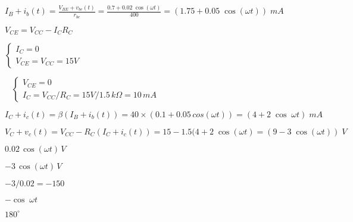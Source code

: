 \documentclass{article}
\def\lthtmlcheckvsize{\ifdim\ht\sizebox<\vsize 
  \ifdim\wd\sizebox<\hsize\expandafter\hfill\fi \expandafter\vfill
  \else\expandafter\vss\fi}%
\begin{document}
{\newpage\clearpage
{}%
$\displaystyle I_B+i_b(t) =\frac{V_{BE}+v_{be}(t)}{r_{be}}
=\frac{0.7+0.02\;\cos(\omega t)}{400}
=(1.75+0.05\;\cos(\omega t))\;mA$%
\lthtmlindisplaymathZ
\lthtmlcheckvsize\clearpage}

{\newpage\clearpage
{}%
$ V_{CE}=V_{CC}-I_C R_C$%
\lthtmlindisplaymathZ
\lthtmlcheckvsize\clearpage}

{\newpage\clearpage
{}%
$\displaystyle \left\{\begin{array}{l}
I_C=0\\V_{CE}=V_{CC}=15V\end{array}\right.
\;\;\;$%
\lthtmlindisplaymathZ
\lthtmlcheckvsize\clearpage}

{\newpage\clearpage
{}%
$\displaystyle \;\;\;
\left\{\begin{array}{l}
V_{CE}=0\\I_C=V_{CC}/R_C=15V/1.5\,k\Omega=10\, mA \end{array}\right.$%
\lthtmlindisplaymathZ
\lthtmlcheckvsize\clearpage}

{\newpage\clearpage
{}%
$\displaystyle I_C+i_c(t)=\beta (I_B+i_b(t))=40\times (0.1+0.05\, cos(\omega t))
=(4 + 2\;\cos\;\omega t) \; mA$%
\lthtmlindisplaymathZ
\lthtmlcheckvsize\clearpage}

{\newpage\clearpage
{}%
$\displaystyle V_C+v_c(t)=V_{CC}-R_C(I_C+i_c(t))=15-1.5 (4 + 2\;\cos(\omega t )
=(9-3\;\cos(\omega t)) \; V$%
\lthtmlindisplaymathZ
\lthtmlcheckvsize\clearpage}

{\newpage\clearpage
{}%
$ 0.02\,\cos(\omega t)\,V$%
\lthtmlindisplaymathZ
\lthtmlcheckvsize\clearpage}

{\newpage\clearpage
{}%
$ -3\,\cos(\omega t)\,V$%
\lthtmlindisplaymathZ
\lthtmlcheckvsize\clearpage}

{\newpage\clearpage
{}%
$ -3/0.02=-150$%
\lthtmlindisplaymathZ
\lthtmlcheckvsize\clearpage}

{\newpage\clearpage
{}%
$ -\cos\;\omega t$%
\lthtmlindisplaymathZ
\lthtmlcheckvsize\clearpage}

{\newpage\clearpage
{}%
$ 180^\circ$%
\lthtmlindisplaymathZ
\lthtmlcheckvsize\clearpage}
\end{document}
